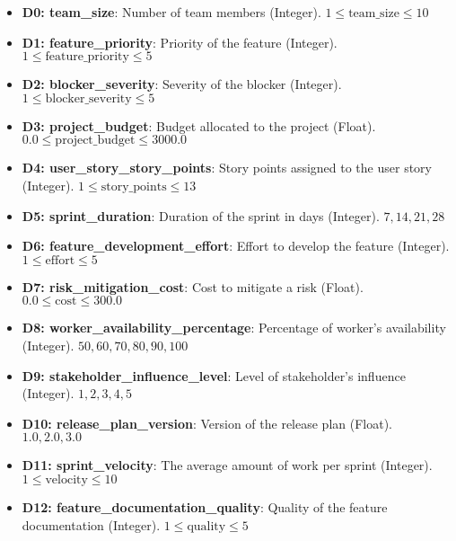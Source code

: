 \documentclass{article}
\begin{document}
\begin{itemize}
    \item \textbf{D0: team\_size}: Number of team members (Integer).  $1 \le \text{team\_size} \le 10$
    \item \textbf{D1: feature\_priority}: Priority of the feature (Integer).  $1 \le \text{feature\_priority} \le 5$
    \item \textbf{D2: blocker\_severity}: Severity of the blocker (Integer).  $1 \le \text{blocker\_severity} \le 5$
    \item \textbf{D3: project\_budget}: Budget allocated to the project (Float).  $0.0 \le \text{project\_budget} \le 3000.0$
    \item \textbf{D4: user\_story\_story\_points}: Story points assigned to the user story (Integer).  $1 \le \text{story\_points} \le 13$
    \item \textbf{D5: sprint\_duration}: Duration of the sprint in days (Integer). $7, 14, 21, 28$
    \item \textbf{D6: feature\_development\_effort}: Effort to develop the feature (Integer). $1 \le \text{effort} \le 5$
    \item \textbf{D7: risk\_mitigation\_cost}: Cost to mitigate a risk (Float). $0.0 \le \text{cost} \le 300.0$
    \item \textbf{D8: worker\_availability\_percentage}: Percentage of worker's availability (Integer). $50,60,70,80,90,100$
    \item \textbf{D9: stakeholder\_influence\_level}: Level of stakeholder's influence (Integer). $1,2,3,4,5$
    \item \textbf{D10: release\_plan\_version}: Version of the release plan (Float). $1.0, 2.0, 3.0$
    \item \textbf{D11: sprint\_velocity}: The average amount of work per sprint (Integer). $1 \le \text{velocity} \le 10$
    \item \textbf{D12: feature\_documentation\_quality}: Quality of the feature documentation (Integer). $1 \le \text{quality} \le 5$
\end{itemize}
\end{document}
